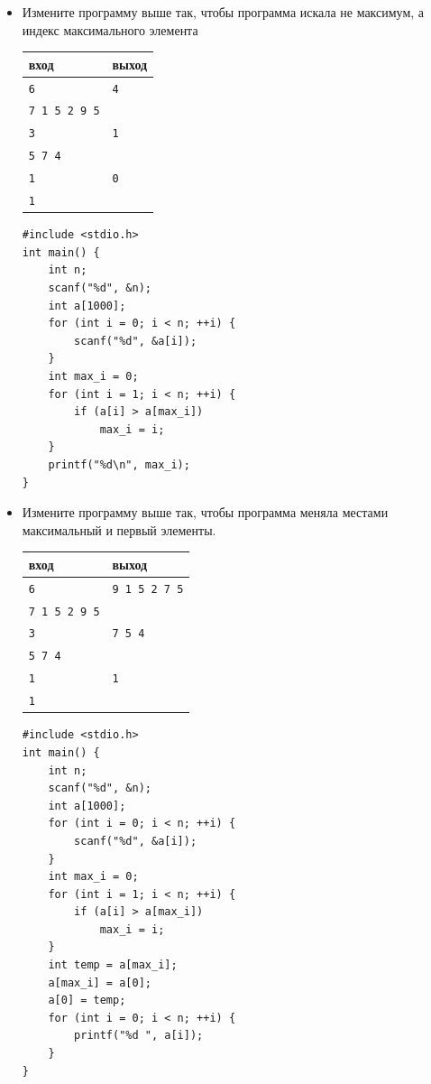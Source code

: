 \documentclass{article}
\begin{document}
\begin{itemize}
\item Измените программу выше так, чтобы программа искала не максимум, а индекс максимального элемента
\begin{center}
\begin{tabular}{ l | l }
 вход & выход \\ \hline
 \texttt{6} & \texttt{4}  \\ 
 \texttt{7 1 5 2 9 5} &   \\ \hline
 \texttt{3} & \texttt{1}  \\ 
 \texttt{5 7 4} &   \\ \hline
 \texttt{1} & \texttt{0}  \\ 
 \texttt{1} &   \\
\end{tabular}
\end{center}
\begin{lstlisting}[backgroundcolor = \color{solcolor}]
#include <stdio.h>
int main() {
    int n;
    scanf("%d", &n);
    int a[1000];
    for (int i = 0; i < n; ++i) {
        scanf("%d", &a[i]);
    }
    int max_i = 0;
    for (int i = 1; i < n; ++i) {
        if (a[i] > a[max_i])
            max_i = i;
    }
    printf("%d\n", max_i); 
}
\end{lstlisting}

\newpage
\item Измените программу выше так, чтобы программа меняла местами максимальный и первый элементы.
\begin{center}
\begin{tabular}{ l | l }
 вход & выход \\ \hline
 \texttt{6} & \texttt{9 1 5 2 7 5}  \\ 
 \texttt{7 1 5 2 9 5} &   \\ \hline
 \texttt{3} & \texttt{7 5 4}  \\ 
 \texttt{5 7 4} &   \\ \hline
 \texttt{1} & \texttt{1}  \\ 
 \texttt{1} &   \\
\end{tabular}
\end{center}

\begin{lstlisting}[backgroundcolor = \color{solcolor}]
#include <stdio.h>
int main() {
    int n;
    scanf("%d", &n);
    int a[1000];
    for (int i = 0; i < n; ++i) {
        scanf("%d", &a[i]);
    }
    int max_i = 0;
    for (int i = 1; i < n; ++i) {
        if (a[i] > a[max_i])
            max_i = i;
    }
    int temp = a[max_i];
    a[max_i] = a[0];
    a[0] = temp;
    for (int i = 0; i < n; ++i) {
        printf("%d ", a[i]); 
    }
}
\end{lstlisting}


\end{itemize}
\end{document}
